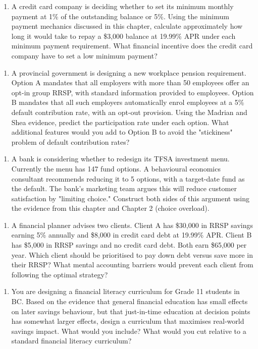 \documentclass[12pt, letterpaper]{article}
\begin{document}
\begin{enumerate}
\item A credit card company is deciding whether to set its minimum monthly payment at 1\% of the outstanding balance or 5\%. Using the minimum payment mechanics discussed in this chapter, calculate approximately how long it would take to repay a \$3,000 balance at 19.99\% APR under each minimum payment requirement. What financial incentive does the credit card company have to set a low minimum payment?
\end{enumerate}

\begin{enumerate}
\item A provincial government is designing a new workplace pension requirement. Option A mandates that all employers with more than 50 employees offer an opt-in group RRSP, with standard information provided to employees. Option B mandates that all such employers automatically enrol employees at a 5\% default contribution rate, with an opt-out provision. Using the Madrian and Shea evidence, predict the participation rate under each option. What additional features would you add to Option B to avoid the "stickiness" problem of default contribution rates?
\end{enumerate}

\begin{enumerate}
\item A bank is considering whether to redesign its TFSA investment menu. Currently the menu has 147 fund options. A behavioural economics consultant recommends reducing it to 5 options, with a target-date fund as the default. The bank's marketing team argues this will reduce customer satisfaction by "limiting choice." Construct both sides of this argument using the evidence from this chapter and Chapter 2 (choice overload).
\end{enumerate}

\begin{enumerate}
\item A financial planner advises two clients. Client A has \$30,000 in RRSP savings earning 5\% annually and \$8,000 in credit card debt at 19.99\% APR. Client B has \$5,000 in RRSP savings and no credit card debt. Both earn \$65,000 per year. Which client should be prioritised to pay down debt versus save more in their RRSP? What mental accounting barriers would prevent each client from following the optimal strategy?
\end{enumerate}

\begin{enumerate}
\item You are designing a financial literacy curriculum for Grade 11 students in BC. Based on the evidence that general financial education has small effects on later savings behaviour, but that just-in-time education at decision points has somewhat larger effects, design a curriculum that maximises real-world savings impact. What would you include? What would you cut relative to a standard financial literacy curriculum?
\end{enumerate}
\end{document}
